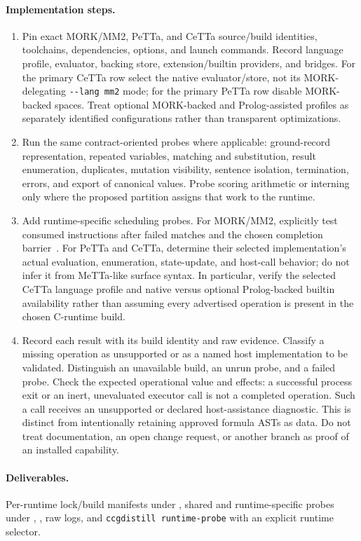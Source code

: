 \documentclass[11pt,a4paper]{article}
\begin{document}
\paragraph{Implementation steps.}
\begin{enumerate}
\item Pin exact MORK/MM2, PeTTa, and CeTTa source/build identities, toolchains,
dependencies, options, and launch commands. Record language profile,
evaluator, backing store, extension/builtin providers, and bridges. For the
primary CeTTa row select the native evaluator/store, not its
MORK-delegating \texttt{-{}-lang mm2} mode; for the primary PeTTa row disable
MORK-backed spaces. Treat optional MORK-backed and Prolog-assisted profiles
as separately identified configurations rather than transparent optimizations.
\item Run the same contract-oriented probes where applicable: ground-record
representation, repeated variables, matching and substitution, result
enumeration, duplicates, mutation visibility, sentence isolation, termination,
errors, and export of canonical values. Probe scoring arithmetic or interning
only where the proposed partition assigns that work to the runtime.
\item Add runtime-specific scheduling probes. For MORK/MM2, explicitly test
consumed instructions after failed matches and the chosen completion
barrier~\cite{morkmm2}. For PeTTa and CeTTa, determine their selected
implementation's actual evaluation, enumeration, state-update, and host-call
behavior; do not infer it from MeTTa-like surface syntax. In particular,
verify the selected CeTTa language profile and native versus optional
Prolog-backed builtin availability rather than assuming every advertised
operation is present in the chosen C-runtime build.
\item Record each result with its build identity and raw evidence. Classify a
missing operation as unsupported or as a named host implementation to be
validated. Distinguish an unavailable build, an unrun probe, and a failed
probe. Check the expected operational value and effects: a successful process
exit or an inert, unevaluated executor call is not a completed operation.
Such a call receives an unsupported or declared host-assistance diagnostic.
This is distinct from intentionally retaining approved formula ASTs as data.
Do not treat documentation, an open change request, or another branch as
proof of an installed capability.
\end{enumerate}

\paragraph{Deliverables.} Per-runtime lock/build manifests under
, shared and runtime-specific probes under
, , raw logs,
and \texttt{ccgdistill runtime-probe} with an explicit runtime selector.
\end{document}
